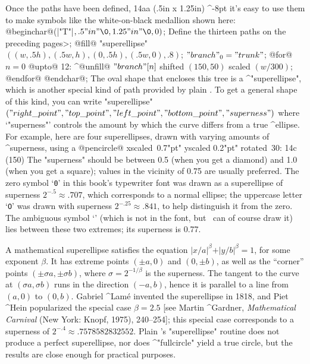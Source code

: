 {{{{\hangindent -1in 
Once the paths have been defined,
\rightfig 14aa (.5in x 1.25in) ^-8pt
it's easy to use them to make
symbols like the white-on-black medallion shown here:
\begindisplay
@beginchar@\kern1pt(|"T"|$,.5"in"\0,1.25"in"\0,0)$;\cr
\<Define the thirteen paths on the preceding pages>;\cr
@fill@ "superellipse"$((w,.5h),(.5w,h),(0,.5h),(.5w,0),.8)$;\cr
$"branch"_0="trunk"$;\cr
@for@ $n=0$ @upto@ 12:\cr
\quad ^@unfill@ $"branch"[n]$ shifted $(150,50)$ scaled $(w/300)$;\cr
@endfor@ @endchar@;\cr
\enddisplay
The oval shape that encloses this tree is a ^"superellipse", which is
another special kind of path provided by plain \MF\!\null. To get a general
shape of this kind, you can write
\begindisplay
"superellipse"$("right\_point","top\_point","left\_point","bottom\_point",
 "superness")$
\enddisplay
where `"superness"' controls the amount by which the curve differs from a
true ^{ellipse}. For example, here are four superellipses, drawn with varying
amounts of ^{superness}, using a
@pencircle@ xscaled~0.7"pt" yscaled 0.2"pt" rotated~30:
\displayfig 14c (150\apspix)
The "superness" should be between 0.5 (when you get a diamond) and 1.0
(when you get a square); values in the vicinity of 0.75 are usually preferred.
The zero symbol `{\tt 0}' in this book's typewriter font was
drawn as a superellipse of superness $2^{-.5}\approx.707$, which
corresponds to a normal ellipse; the uppercase letter `{\tt O}' was
drawn with superness $2^{-.25}\approx.841$, to help distinguish it
from the zero. The ambiguous symbol `{}' (which is not in the
font, but \MF\ can of course draw it) lies between these two extremes; its
superness is 0.77.

\ddanger A mathematical superellipse satisfies the equation $\vert
x/a\vert^\beta+\vert y/b\vert^\beta=1$, for some exponent $\beta$.  It has
extreme points $(\pm a,0)$ and $(0,\pm b)$, as well as the ``corner''
points $(\pm\sigma a,\pm\sigma b)$, where $\sigma=2^{-1/\beta}$ is the
superness.  The tangent to the curve at $(\sigma a,\sigma b)$ runs in the
direction $(-a,b)$, hence it is parallel to a line from $(a,0)$ to
$(0,b)$. Gabriel ^{Lam\'e} invented the superellipse in 1818, and
Piet ^{Hein} popularized the special case
$\beta=2.5$ [see Martin ^{Gardner}, {\sl Mathematical
Carnival\/} (New York: Knopf, 1975), 240--254]; this special case
corresponds to a superness of $2^{-.4}\approx.7578582832552$. Plain \MF's
"superellipse" routine does not produce a perfect superellipse, nor does
^"fullcircle" yield a true circle, but the results are close enough for
practical purposes.

}}}}
